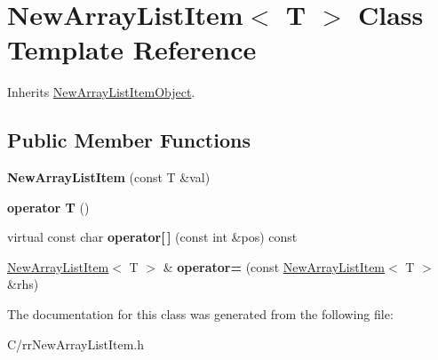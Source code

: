 \hypertarget{classrrc_1_1_new_array_list_item}{\section{New\-Array\-List\-Item$<$ T $>$ Class Template Reference}
\label{classrrc_1_1_new_array_list_item}
}


Inherits \hyperlink{classrrc_1_1_new_array_list_item_object}{New\-Array\-List\-Item\-Object}.

\subsection*{Public Member Functions}
\begin{DoxyCompactItemize}
\item 
\hypertarget{classrrc_1_1_new_array_list_item_a1dc8068c01864edc4da6f258778310e9}{{\bfseries New\-Array\-List\-Item} (const T \&val)}\label{classrrc_1_1_new_array_list_item_a1dc8068c01864edc4da6f258778310e9}

\item 
\hypertarget{classrrc_1_1_new_array_list_item_a4b15b6419d4ff99730ee9df795b90f61}{{\bfseries operator T} ()}\label{classrrc_1_1_new_array_list_item_a4b15b6419d4ff99730ee9df795b90f61}

\item 
\hypertarget{classrrc_1_1_new_array_list_item_a15f637c8efc2644cb9b7da0199bebffc}{virtual const char {\bfseries operator\mbox{[}$\,$\mbox{]}} (const int \&pos) const }\label{classrrc_1_1_new_array_list_item_a15f637c8efc2644cb9b7da0199bebffc}

\item 
\hypertarget{classrrc_1_1_new_array_list_item_ad33728ebfa7d12c18b1129dc4f61d5b2}{\hyperlink{classrrc_1_1_new_array_list_item}{New\-Array\-List\-Item}$<$ T $>$ \& {\bfseries operator=} (const \hyperlink{classrrc_1_1_new_array_list_item}{New\-Array\-List\-Item}$<$ T $>$ \&rhs)}\label{classrrc_1_1_new_array_list_item_ad33728ebfa7d12c18b1129dc4f61d5b2}

\end{DoxyCompactItemize}


The documentation for this class was generated from the following file\-:\begin{DoxyCompactItemize}
\item 
C/rr\-New\-Array\-List\-Item.\-h\end{DoxyCompactItemize}
